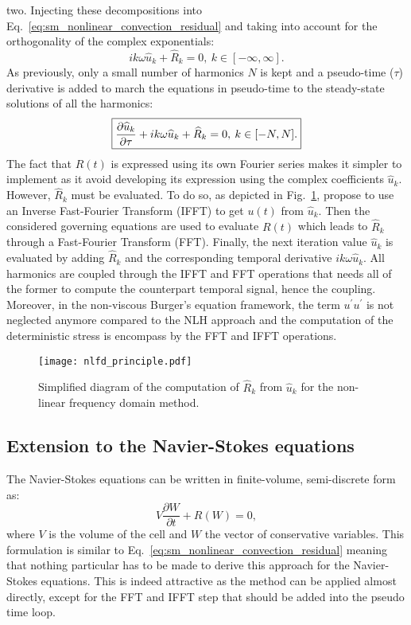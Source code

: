 two.
Injecting these decompositions into 
Eq.~\eqref{eq:sm_nonlinear_convection_residual} and taking into account
for the orthogonality of the complex exponentials:
\begin{equation}
	i k \omega \widehat{u}_k + \widehat{R}_k = 0, \: k \in [-\infty, \infty].
\end{equation}
As previously, only a small number of harmonics $N$ is kept and 
a pseudo-time ($\tau$) derivative is added to march the equations
in pseudo-time to the steady-state solutions of all the harmonics:
\begin{equation}
	\fbox{$
	\displaystyle \frac{\partial \widehat{u}_k}{\partial \tau} + 
	i k \omega \widehat{u}_k + \widehat{R}_k = 0, \: k \in [-N, N].
	$}
	\label{eq:sm_nlfd_subset_eq}
\end{equation}
The fact that $R(t)$ is expressed using its own Fourier series 
makes it simpler to implement 
as it avoid developing its expression using 
the complex coefficients $\widehat{u}_k$. 
However, $\widehat{R}_k$ must be evaluated. To do so, as depicted
in Fig.~\ref{fig:nlfd_principle}, \citet{McMullen2001}
propose to use an Inverse Fast-Fourier Transform (IFFT) to get
$u(t)$ from $\widehat{u}_k$. Then the considered governing equations
are used to evaluate $R(t)$ which leads to $\widehat{R}_k$
through a Fast-Fourier Transform (FFT). Finally, the next iteration value 
$\widehat{u}_k$
is evaluated by adding $\widehat{R}_k$ and 
the corresponding temporal derivative $i k \omega \widehat{u}_k$. All
harmonics are coupled through the IFFT and FFT operations
that needs all of the former to compute the counterpart temporal signal,
hence the coupling. Moreover, 
in the non-viscous Burger's equation framework, 
the term $u^\prime u^\prime$ is not neglected anymore compared to the
NLH approach and the computation of the deterministic stress is encompass
by the FFT and IFFT operations.
\begin{figure}[htbp]
  \centering
  \texttt{[image: nlfd\_principle.pdf]}
  \caption{Simplified diagram of the computation of $\widehat{R}_k$ from $\widehat{u}_k$
  for the non-linear frequency domain method.}
  \label{fig:nlfd_principle}
\end{figure}

\subsection{Extension to the Navier-Stokes equations}
The Navier-Stokes equations can be written in finite-volume,
semi-discrete form as:
\begin{equation}
	V \frac{\partial W}{\partial t} + R(W) = 0,
	\label{eq:navier_stokes_fv_sd}
\end{equation}
where $V$ is the volume of the cell and $W$
the vector of conservative variables.
This formulation is similar to
Eq.~\eqref{eq:sm_nonlinear_convection_residual} meaning that
nothing particular has to be made to derive this approach for
the Navier-Stokes equations. This is indeed attractive as the
method can be applied almost directly, except for the FFT and IFFT
step that should be added into the pseudo time loop.

